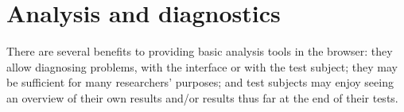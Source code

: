 \documentclass{sig-alternate}
\begin{document}
	

\section{Analysis and diagnostics}
\label{sec:analysis}
	There are several benefits to providing basic analysis tools in the browser: they allow diagnosing problems, with the interface or with the test subject; they may be sufficient for many researchers' purposes; and test subjects may enjoy seeing an overview of their own results and/or results thus far at the end of their tests. 
	
\end{document}
